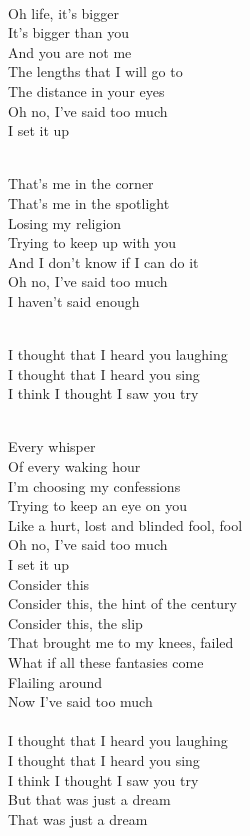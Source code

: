 \begin{multicols}{2}

    {\\
    Oh life, it's bigger\\
    It's bigger than you\\
    And you are not me\\
    The lengths that I will go to\\
    The distance in your eyes\\
    Oh no, I've said too much\\
    I set it up
    }


    {\\
    That's me in the corner\\
    That's me in the spotlight\\
    Losing my religion\\
    Trying to keep up with you\\
    And I don't know if I can do it\\
    Oh no, I've said too much\\
    I haven't said enough
    }

    {\\
    I thought that I heard you laughing\\
    I thought that I heard you sing\\
    I think I thought I saw you try
    }

    {\\
    Every whisper\\
    Of every waking hour\\
    I'm choosing my confessions\\
    Trying to keep an eye on you\\
    Like a hurt, lost and blinded fool, fool\\
    Oh no, I've said too much\\
    I set it up
    }
    {\\
    Consider this\\
    Consider this, the hint of the century\\
    Consider this, the slip\\
    That brought me to my knees, failed\\
    What if all these fantasies come\\
    Flailing around\\
    Now I've said too much\\
    }
    {\\
    I thought that I heard you laughing\\
    I thought that I heard you sing\\
    I think I thought I saw you try\\
    }
    {
        But that was just a dream\\
        That was just a dream\\
    }


\end{multicols}
